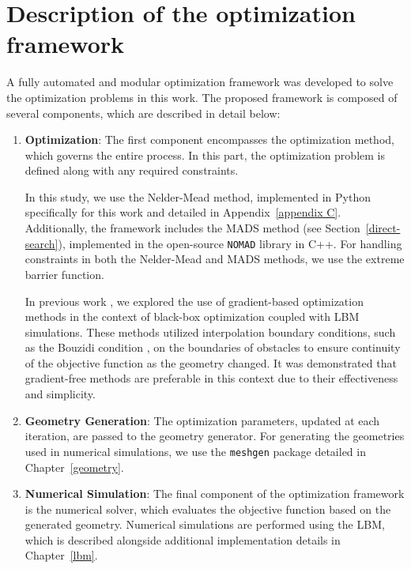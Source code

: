 \section{Description of the optimization framework}\label{framework}
A fully automated and modular optimization framework was developed to solve the optimization problems in this work. The proposed framework is composed of several components, which are described in detail below:

\begin{enumerate}
	\item \textbf{Optimization}:  
	The first component encompasses the optimization method, which governs the entire process. In this part, the optimization problem is defined along with any required constraints.
	
	In this study, we use the Nelder-Mead method, implemented in Python specifically for this work and detailed in Appendix~\ref{appendix C}. Additionally, the framework includes the MADS method (see Section~\ref{direct-search}), implemented in the open-source \texttt{NOMAD} library \cite{nomad} in C++. For handling constraints in both the Nelder-Mead and MADS methods, we use the extreme barrier function.
	
	In previous work \cite{buresBP, buresVU}, we explored the use of gradient-based optimization methods in the context of black-box optimization coupled with LBM simulations. These methods utilized interpolation boundary conditions, such as the Bouzidi condition \cite{Bouzidi2001}, on the boundaries of obstacles to ensure continuity of the objective function as the geometry changed. It was demonstrated that gradient-free methods are preferable in this context due to their effectiveness and simplicity.

	
	\item \textbf{Geometry Generation}:  
	The optimization parameters, updated at each iteration, are passed to the geometry generator. For generating the geometries used in numerical simulations, we use the \texttt{meshgen} package detailed in Chapter~\ref{geometry}.
	
	\item \textbf{Numerical Simulation}:  
	The final component of the optimization framework is the numerical solver, which evaluates the objective function based on the generated geometry. Numerical simulations are performed using the LBM, which is described alongside additional implementation details in Chapter~\ref{lbm}.
\end{enumerate}

